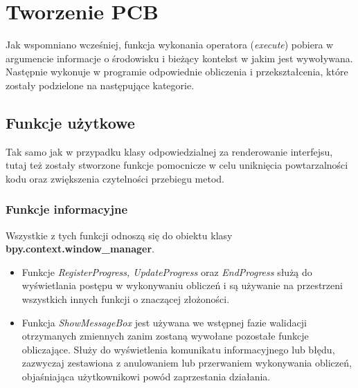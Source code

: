 \documentclass[brudnopis]{xmgr}
\begin{document}

\section {Tworzenie PCB}
Jak wspomniano wcześniej, funkcja wykonania operatora (\emph{execute}) pobiera w argumencie informacje o środowisku i bieżący kontekst w jakim jest wywoływana. Następnie wykonuje w programie odpowiednie obliczenia i przekształcenia, które zostały podzielone na następujące kategorie.
\subsection{Funkcje użytkowe}
Tak samo jak w przypadku klasy odpowiedzialnej za renderowanie interfejsu, tutaj też zostały stworzone funkcje pomocnicze w celu uniknięcia powtarzalności kodu oraz zwiększenia czytelności przebiegu metod.
\newpage
\subsubsection{Funkcje informacyjne}
Wszystkie z tych funkcji odnoszą się do obiektu klasy \textbf{bpy.context.window\_manager}.
\begin{itemize}
\item Funkcje \emph{RegisterProgress, UpdateProgress} oraz \emph{EndProgress} służą do wyświetlania postępu w wykonywaniu obliczeń i są używanie na przestrzeni wszystkich innych funkcji o znaczącej złożoności. 
\item Funkcja \emph{ShowMessageBox} jest używana we wstępnej fazie walidacji otrzymanych zmiennych zanim zostaną wywołane pozostałe funkcje obliczające. Służy do wyświetlenia komunikatu informacyjnego lub błędu, zazwyczaj zestawiona z anulowaniem lub przerwaniem wykonywania obliczeń, objaśniająca użytkownikowi powód zaprzestania działania.
\end{itemize}
\end{document}
